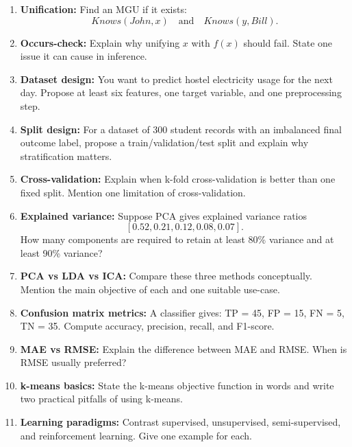 \documentclass[11pt,a4paper]{article}
\begin{document}
\begin{enumerate}[label=M\arabic*., leftmargin=*]
  \item \textbf{Unification:} Find an MGU if it exists:
    \[
      Knows(John,x) \quad \text{and} \quad Knows(y,Bill).
    \]

  \item \textbf{Occurs-check:} Explain why unifying $x$ with $f(x)$ should fail.
    State one issue it can cause in inference.

  \item \textbf{Dataset design:} You want to predict hostel electricity usage for the next day.
    Propose at least six features, one target variable, and one preprocessing step.

  \item \textbf{Split design:} For a dataset of 300 student records with an imbalanced final outcome label,
    propose a train/validation/test split and explain why stratification matters.

  \item \textbf{Cross-validation:} Explain when k-fold cross-validation is better than one fixed split.
    Mention one limitation of cross-validation.

  \item \textbf{Explained variance:} Suppose PCA gives explained variance ratios
    \[
      [0.52, 0.21, 0.12, 0.08, 0.07].
    \]
    How many components are required to retain at least 80\% variance and at least 90\% variance?

  \item \textbf{PCA vs LDA vs ICA:} Compare these three methods conceptually.
    Mention the main objective of each and one suitable use-case.

  \item \textbf{Confusion matrix metrics:} A classifier gives:
    TP = 45, FP = 15, FN = 5, TN = 35.
    Compute accuracy, precision, recall, and F1-score.

  \item \textbf{MAE vs RMSE:} Explain the difference between MAE and RMSE.
    When is RMSE usually preferred?

  \item \textbf{k-means basics:} State the k-means objective function in words and write two practical pitfalls of using k-means.

  \item \textbf{Learning paradigms:} Contrast supervised, unsupervised, semi-supervised,
    and reinforcement learning. Give one example for each.
\end{enumerate}
\end{document}
